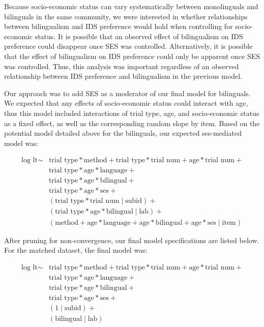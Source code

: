 \documentclass[,man,floatsintext]{apa6}
\begin{document}
Because socio-economic status can vary systematically between monolinguals and bilinguals in the same community, we were interested in whether relationships between bilingualism and IDS preference would hold when controlling for socio-economic status. It is possible that an observed effect of bilingualism on IDS preference could disappear once SES was controlled. Alternatively, it is possible that the effect of bilingualism on IDS preference could only be apparent once SES was controlled. Thus, this analysis was important regardless of an observed relationship between IDS preference and bilingualism in the previous model.

Our approach was to add SES as a moderator of our final model for bilinguals. We expected that any effects of socio-economic status could interact with age, thus this model included interactions of trial type, age, and socio-economic status as a fixed effect, as well as the corresponding random slope by item. Based on the potential model detailed above for the bilinguals, our expected ses-mediated model was:

\begin{equation}
\begin{split}
\text{log lt} \sim & \text{trial type} * \text{method} + \text{trial type} * \text{trial num} + \text{age} * \text{trial num} + \\
& \text{trial type} * \text{age} * \text{language} + \\
& \text{trial type} * \text{age} * \text{bilingual} + \\
& \text{trial type} * \text{age} * \text{ses} + \\
& (\text{trial type} * \text{trial num} \mid \text{subid}) + \\
& (\text{trial type} * \text{age} * \text{bilingual} \mid \text{lab}) + \\
& (\text{method} + \text{age} * \text{language} + \text{age} * \text{bilingual} +
\text{age} * \text{ses} \mid \text{item})
\end{split}
\end{equation}

After pruning for non-convergence, our final model specifications are listed below. For the matched dataset, the final model was:

\begin{equation}
\begin{split}
\text{log lt} \sim & \text{trial type} * \text{method} + \text{trial type} * \text{trial num} + \text{age} * \text{trial num} + \\
& \text{trial type} * \text{age} * \text{language} + \\
& \text{trial type} * \text{age} * \text{bilingual} + \\
& \text{trial type} * \text{age} * \text{ses} + \\
& (1 \mid \text{subid}) + \\
& (\text{bilingual} \mid \text{lab}) 
\end{split}
\end{equation}
\end{document}
